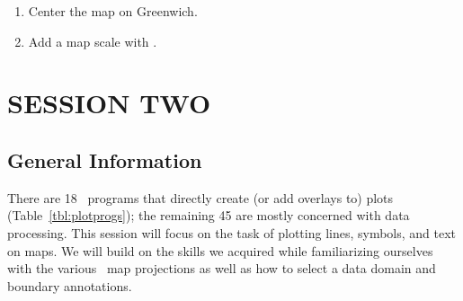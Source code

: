 \documentclass[11pt]{report}
\begin{document}
\begin{enumerate}

\item Center the map on Greenwich.

\item Add a map scale with .

\end{enumerate}

\chapter{SESSION TWO} 

\section{General Information}

There are 18 \GMT\ programs that directly create (or add overlays to)
plots (Table~\ref{tbl:plotprogs}); the remaining 45 are mostly concerned with data
processing.  This session will focus on the task of plotting
lines, symbols, and text on maps.  We will build on the skills
we acquired while familiarizing ourselves with the various
\GMT\ map projections as well as how to select a data domain
and boundary annotations.
\end{document}

